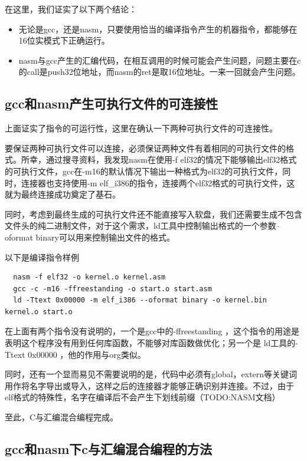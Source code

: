 \documentclass[forprint]{WHUBachelor}
\begin{document}
在这里，我们证实了以下两个结论：

\begin{itemize}
  \item 无论是gcc，还是nasm，只要使用恰当的编译指令产生的机器指令，都能够在16位实模式下正确运行。
  \item nasm与gcc产生的汇编代码，在相互调用的时候可能会产生问题，问题主要在c的call是push32位地址，而nasm的ret是取16位地址。一来一回就会产生问题。
\end{itemize}

\subsection{gcc和nasm产生可执行文件的可连接性}

上面证实了指令的可运行性，这里在确认一下两种可执行文件的可连接性。

要保证两种可执行文件可以连接，必须保证两种文件有着相同的可执行文件的格式。所幸，通过搜寻资料，我发现nasm在使用-f elf32的情况下能够输出elf32格式的可执行文件，gcc在-m16的默认情况下输出一种格式为elf32的可执行文件，同时，连接器也支持使用-m elf\_i386的指令，连接两个elf32格式的可执行文件，这就为最终连接成功奠定了基石。

同时，考虑到最终生成的可执行文件还不能直接写入软盘，我们还需要生成不包含文件头的纯二进制文件，对于这个需求，ld工具中控制输出格式的一个参数--oformat binary可以用来控制输出文件的格式。

以下是编译指令样例

\begin{lstlisting}
  nasm -f elf32 -o kernel.o kernel.asm
  gcc -c -m16 -ffreestanding -o start.o start.asm
  ld -Ttext 0x00000 -m elf_i386 --oformat binary -o kernel.bin kernel.o start.o
\end{lstlisting}

在上面有两个指令没有说明的，一个是gcc中的-ffreestanding ，这个指令的用途是表明这个程序没有用到任何库函数，不能够对库函数做优化；另一个是 ld工具的-Ttext 0x00000 ，他的作用与org类似。

同时，还有一个显而易见不需要说明的是，代码中必须有global，extern等关键词用作将名字导出或导入，这样之后的连接器才能够正确识别并连接。不过，由于elf格式的特殊性，名字在编译后不会产生下划线前缀（TODO:NASM文档）

至此，C与汇编混合编程完成。

\subsection{gcc和nasm下c与汇编混合编程的方法}
\end{document}
